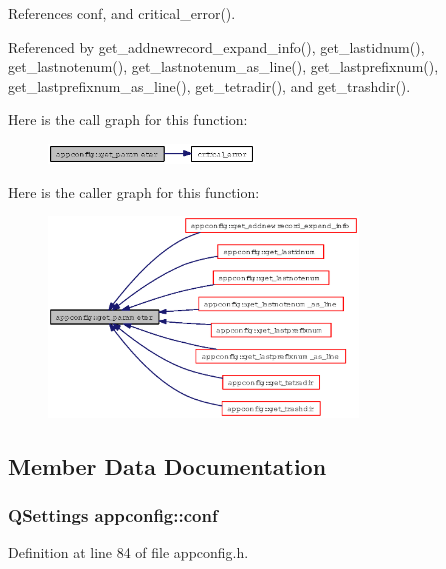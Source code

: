 References conf, and critical\_\-error().

Referenced by get\_\-addnewrecord\_\-expand\_\-info(), get\_\-lastidnum(), get\_\-lastnotenum(), get\_\-lastnotenum\_\-as\_\-line(), get\_\-lastprefixnum(), get\_\-lastprefixnum\_\-as\_\-line(), get\_\-tetradir(), and get\_\-trashdir().

Here is the call graph for this function:\begin{figure}[H]
\begin{center}
\leavevmode
\includegraphics[width=155pt]{classappconfig_d2db70d1978d1ca2bc0091a712ba641f_cgraph}
\end{center}
\end{figure}


Here is the caller graph for this function:\begin{figure}[H]
\begin{center}
\leavevmode
\includegraphics[width=233pt]{classappconfig_d2db70d1978d1ca2bc0091a712ba641f_icgraph}
\end{center}
\end{figure}


\subsection{Member Data Documentation}
\subsubsection{\setlength{\rightskip}{0pt plus 5cm}QSettings {\bf appconfig::conf}\hspace{0.3cm}{\tt  [static, private]}}\label{classappconfig_753e9d9be9b93c732723b861a9a354b8}




Definition at line 84 of file appconfig.h.

